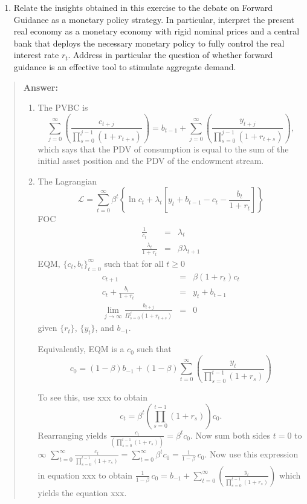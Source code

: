 \begin{exercise}
\begin{enumerate}
\item Relate the insights obtained in this exercise to the debate on Forward Guidance as a monetary policy strategy. In particular, interpret  the present real economy 
as a monetary economy with rigid nominal prices and a central bank that deploys the necessary monetary policy  to fully control  the real interest rate $r_t$.  Address in particular the question of whether forward guidance  is an effective tool to stimulate aggregate demand. 
\end{enumerate}
\begin{quote}
{\bf Answer:}
\begin{enumerate}
\item The PVBC is 
\begin{equation}
\sum_{j=0}^{\infty} 
\left(
\frac
{c_{t+j}}
{\displaystyle \prod_{s=0}^{j-1} (1+r_{t+s})} 
\right)
=
b_{t-1}
+
\sum_{j=0}^{\infty} 
\left(
\frac
{y_{t+j} }
{\displaystyle \prod_{s=0}^{j-1} (1+r_{t+s})} 
\right),
\end{equation}
which says that the PDV of consumption is equal to the sum of the  initial asset position and the PDV of the endowment stream. 
\item 
The Lagrangian
\[
\mathcal{L} = \sum_{t=0}^{\infty} \beta^t \left\{
\ln c_t + \lambda_t \left[ y_t  + b_{t-1} - c_t - \frac{b_t}{1+r_t} \right]\right\}
\]
FOC
\begin{eqnarray*}
\frac{1}{c_t}& = &\lambda_t\\
\frac{\lambda_t}{1+r_t} &=& \beta \lambda_{t+1}
\end{eqnarray*}
EQM, $\{c_t,  b_t\}_{t=0}^{\infty}$ such that for all $t\ge 0$
\begin{eqnarray}
c_{t+1}&=& \beta (1+r_t)c_t\\
\label{eq:bc}
c_t + \frac{b_t}{1+r_t}& = &y_t  + b_{t-1}\\
\label{eq:tvc}
\lim_{j\rightarrow \infty} \frac{b_{t+j}}{\Pi_{s=0}^j (1+r_{t+s})}&= &0 
\end{eqnarray}
given $\{r_t\}$, $\{y_t\}$, and $b_{-1}$.

Equivalently, EQM  is a $c_0$ such that 
\begin{equation}
c_0 = (1-\beta) b_{-1}
+ (1-\beta)  \sum_{t=0}^{\infty} 
\left(
\frac
{y_{t} }
{\displaystyle \prod_{s=0}^{t-1} (1+r_{s})} 
\right)
\end{equation}

To see this, use xxx to obtain
\begin{equation}
c_t = \beta^t\left( \prod_{s=0}^{t-1} (1+r_s)\right) c_0.
\end{equation}
Rearranging yields 
$
\frac{c_t}{\left( \prod_{s=0}^{t-1} (1+r_s)\right)} = \beta^t c_0.
$
Now sum both sides $t=0$ to $\infty$
$\sum_{t=0}^{\infty} 
\frac{
 c_{t}}
{ \prod_{s=0}^{t-1} (1+r_{s})} 
= \sum_{t=0}^{\infty} 
\beta^t c_0 = \frac{1}{1-\beta}\,  c_0.
$ Now use this expression in equation xxx to obtain 
$
\frac{1}{1-\beta}\,  c_0
=
b_{-1}
+
\sum_{t=0}^{\infty} 
\left(
\frac
{y_{t} }
{ \prod_{s=0}^{t-1} (1+r_{s})} 
\right)
$
which yields the equation xxx.



\end{enumerate}
\end{quote}
\end{exercise}
